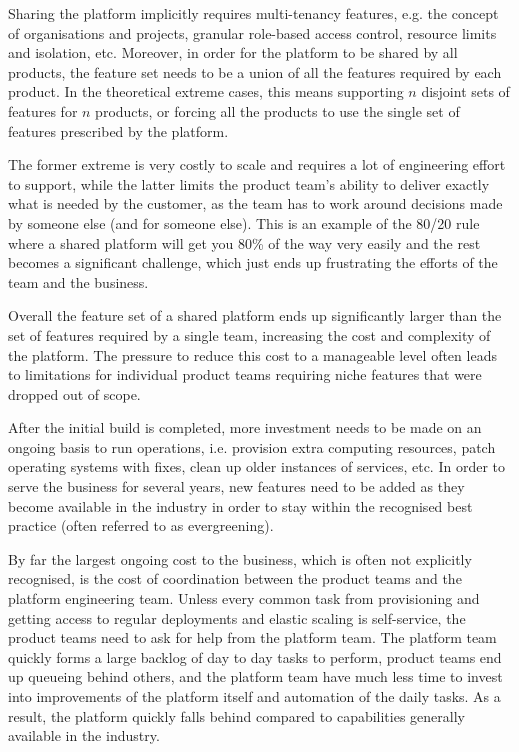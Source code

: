 \documentclass[reprint,amsmath,amssymb,aps]{revtex4-1}
\begin{document}
Sharing the platform implicitly requires multi-tenancy features, e.g. the concept of organisations and projects, granular role-based access control, resource limits and isolation, etc. Moreover, in order for the platform to be shared by all products, the feature set needs to be a union of all the features required by each product. In the theoretical extreme cases, this means supporting $n$ disjoint sets of features for $n$ products, or forcing all the products to use the single set of features prescribed by the platform.

The former extreme is very costly to scale and requires a lot of engineering effort to support, while the latter limits the product team's ability to deliver exactly what is needed by the customer, as the team has to work around decisions made by someone else (and for someone else). This is an example of the 80/20 rule where a shared platform will get you 80\% of the way very easily and the rest becomes a significant challenge, which just ends up frustrating the efforts of the team and the business.

Overall the feature set of a shared platform ends up significantly larger than the set of features required by a single team, increasing the cost and complexity of the platform. The pressure to reduce this cost to a manageable level often leads to limitations for individual product teams requiring niche features that were dropped out of scope.

After the initial build is completed, more investment needs to be made on an ongoing basis to run operations, i.e. provision extra computing resources, patch operating systems with fixes, clean up older instances of services, etc. In order to serve the business for several years, new features need to be added as they become available in the industry in order to stay within the recognised best practice (often referred to as evergreening).

By far the largest ongoing cost to the business, which is often not explicitly recognised, is the cost of coordination between the product teams and the platform engineering team. Unless every common task from provisioning and getting access to regular deployments and elastic scaling is self-service, the product teams need to ask for help from the platform team. The platform team quickly forms a large backlog of day to day tasks to perform, product teams end up queueing behind others, and the platform team have much less time to invest into improvements of the platform itself and automation of the daily tasks. As a result, the platform quickly falls behind compared to capabilities generally available in the industry.
\end{document}
